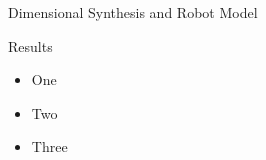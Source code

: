 \documentclass[c]{beamer}
\newcommand{\postersubsection}[1]{%
\setlength\fboxsep{0pt}%
\vfil\penalty125\vfilneg\vskip1.5ex
\colorbox{Grau}{\parbox[b]{\columnwidth}{\vskip0.75ex%
\Large\hskip1ex #1%
\vskip0.75ex}}%
}
\begin{document}
\begin{frame}
\begin{whiteblock}{Dimensional Synthesis and Robot Model}
{\begin{multicols}{2}
\end{multicols}}
\end{whiteblock}
\begin{block}{Results}
\parbox{\columnwidth}{
\begin{multicols}{2}
[]
\begin{itemize}
    \item One
    \item Two
    \item Three
\end{itemize}


\begin{figure}[t]
    \centering
    
\end{figure}


\end{multicols}}
\end{block}
\end{frame}
\end{document}
